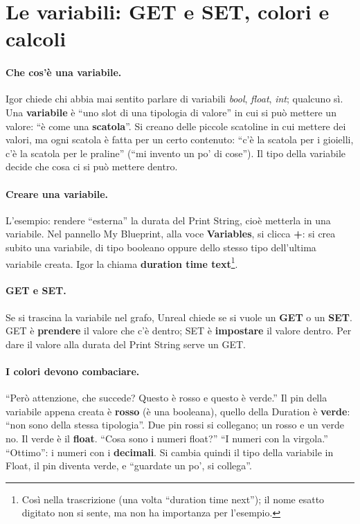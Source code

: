 \section{Le variabili: GET e SET, colori e calcoli}
\label{ue2:sec:variabili}

\paragraph{Che cos'è una variabile.} Igor chiede chi abbia mai sentito parlare di
variabili \emph{bool}, \emph{float}, \emph{int}; qualcuno sì. Una \textbf{variabile} è
``uno slot di una tipologia di valore'' in cui si può mettere un valore: ``è come una
\textbf{scatola}''. Si creano delle piccole scatoline in cui mettere dei valori, ma ogni
scatola è fatta per un certo contenuto: ``c'è la scatola per i gioielli, c'è la scatola
per le praline'' (``mi invento un po' di cose''). Il tipo della variabile decide che cosa
ci si può mettere dentro.

\paragraph{Creare una variabile.} L'esempio: rendere ``esterna'' la durata del Print
String, cioè metterla in una variabile. Nel pannello My Blueprint, alla voce
\textbf{Variables}, si clicca \textbf{+}: si crea subito una variabile, di tipo booleano
oppure dello stesso tipo dell'ultima variabile creata. Igor la chiama \textbf{duration
time text}\footnote{Così nella trascrizione (una volta ``duration time next''); il nome
esatto digitato non si sente, ma non ha importanza per l'esempio.}.

\paragraph{GET e SET.} Se si trascina la variabile nel grafo, Unreal chiede se si vuole
un \textbf{GET} o un \textbf{SET}. GET è \textbf{prendere} il valore che c'è dentro; SET
è \textbf{impostare} il valore dentro. Per dare il valore alla durata del Print String
serve un GET.

\paragraph{I colori devono combaciare.} ``Però attenzione, che succede? Questo è rosso e
questo è verde.'' Il pin della variabile appena creata è \textbf{rosso} (è una
booleana), quello della Duration è \textbf{verde}: ``non sono della stessa tipologia''.
Due pin rossi si collegano; un rosso e un verde no. Il verde è il \textbf{float}. ``Cosa
sono i numeri float?'' ``I numeri con la virgola.'' ``Ottimo'': i numeri con i
\textbf{decimali}. Si cambia quindi il tipo della variabile in Float, il pin diventa
verde, e ``guardate un po', si collega''.

